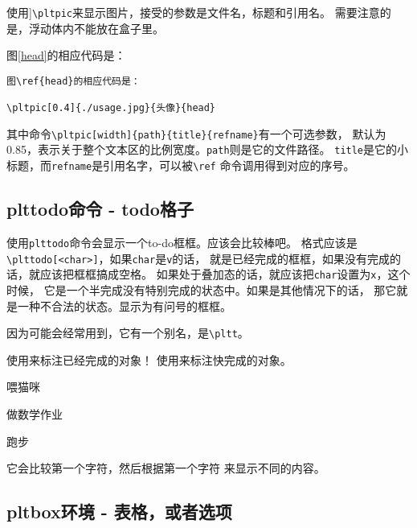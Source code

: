 \documentclass{peterlitsdoc}
\newcommand{\vb}{\verb}
\begin{document}
使用]\vb|\pltpic|来显示图片，接受的参数是文件名，标题和引用名。
需要注意的是，浮动体内不能放在盒子里。

图\ref{head}的相应代码是：

\begin{lstlisting}
图\ref{head}的相应代码是：

\pltpic[0.4]{./usage.jpg}{头像}{head}
\end{lstlisting}


其中命令\vb|\pltpic[width]{path}{title}{refname}|有一个可选参数，
默认为0.85，表示关于整个文本区的比例宽度。\vb|path|则是它的文件路径。
\vb|title|是它的小标题，而\vb|refname|是引用名字，可以被\vb|\ref|
命令调用得到对应的序号。



\subsection{plttodo命令 - todo格子}

使用\vb|plttodo|命令会显示一个to-do框框。应该会比较棒吧。
格式应该是\vb|\plttodo[<char>]|，如果\vb|char|是\vb|v|的话，
就是已经完成的框框，如果没有完成的话，就应该把框框搞成空格。
如果处于叠加态的话，就应该把\vb|char|设置为\vb|x|，这个时候，
它是一个半完成没有特别完成的状态中。如果是其他情况下的话，
那它就是一种不合法的状态。显示为有问号的框框。

因为可能会经常用到，它有一个别名，是\vb|\pltt|。

\begin{pltrun}
使用\plttodo[v]来标注已经完成的对象！
使用\plttodo[x]来标注快完成的对象。

\plttodo[v]喂猫咪

\plttodo[x]做数学作业

\plttodo[ ]跑步

它会比较第一个字符，然后根据第一个字符
来显示不同的内容。

\pltt[]   \pltt[x]  \pltt[  ] \pltt[ ]
\pltt[aa] \pltt[ a] \pltt[v]  \pltt[vv]
\pltt[ v]
\end{pltrun}



\subsection{pltbox环境 - 表格，或者选项}
\end{document}
